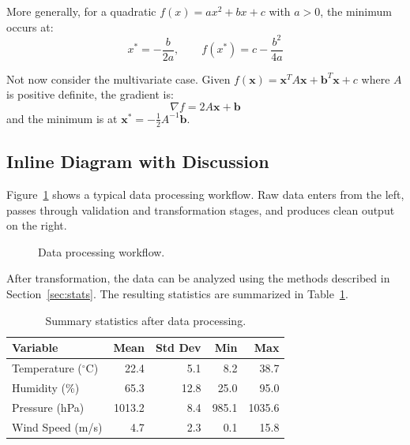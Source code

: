 \documentclass[11pt]{article}
\begin{document}
More generally, for a quadratic $f(x) = ax^2 + bx + c$ with $a > 0$, the
minimum occurs at:
\begin{equation}
  x^* = -\frac{b}{2a}, \qquad f(x^*) = c - \frac{b^2}{4a}
\end{equation}

Not now consider the multivariate case. Given $f(\mathbf{x}) = \mathbf{x}^T A \mathbf{x} + \mathbf{b}^T \mathbf{x} + c$
where $A$ is positive definite, the gradient is:
\begin{equation}
  \nabla f = 2A\mathbf{x} + \mathbf{b}
\end{equation}
and the minimum is at $\mathbf{x}^* = -\frac{1}{2}A^{-1}\mathbf{b}$.

\subsection{Inline Diagram with Discussion}

Figure~\ref{fig:workflow} shows a typical data processing workflow. Raw data
enters from the left, passes through validation and transformation stages,
and produces clean output on the right.

\begin{figure}[h!]
\centering
{}
\caption{Data processing workflow.}
\label{fig:workflow}
\end{figure}

After transformation, the data can be analyzed using the methods described
in Section~\ref{sec:stats}. The resulting statistics are summarized in
Table~\ref{tab:summary}.

\begin{table}[h!]
\centering
\caption{Summary statistics after data processing.}
\label{tab:summary}
\begin{tabular}{@{} l r r r r @{}}
\toprule
Variable & Mean & Std Dev & Min & Max \\
\midrule
Temperature ($^\circ$C) & 22.4 & 5.1 & 8.2 & 38.7 \\
Humidity (\%) & 65.3 & 12.8 & 25.0 & 95.0 \\
Pressure (hPa) & 1013.2 & 8.4 & 985.1 & 1035.6 \\
Wind Speed (m/s) & 4.7 & 2.3 & 0.1 & 15.8 \\
\bottomrule
\end{tabular}
\end{table}
\end{document}

